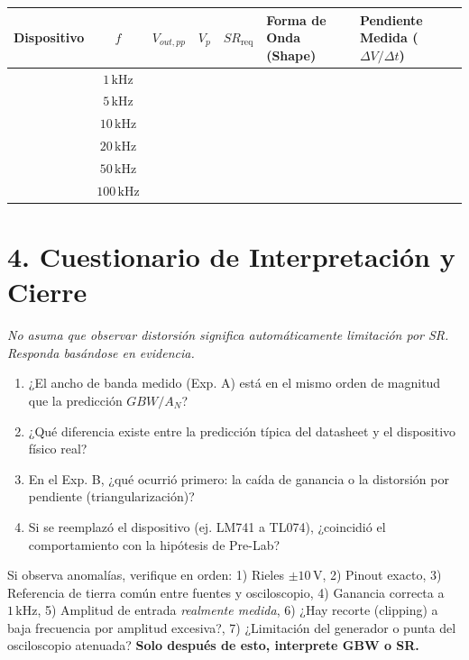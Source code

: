 \documentclass[11pt, a4paper]{article}
\begin{document}
\vspace{0.4cm}
\begin{table}[h!]
    \centering
    \footnotesize
    \renewcommand{\arraystretch}{1.3}
    \begin{tabularx}{\textwidth}{|>{\hsize=0.8\hsize}X|c|c|c|c|X|X|}
    \hline
    \textbf{Dispositivo} & \textbf{$f$} & \textbf{$V_{out,pp}$} & \textbf{$V_p$} & \textbf{$SR_{\mathrm{req}}$} & \textbf{Forma de Onda (Shape)} & \textbf{Pendiente Medida ($\Delta V/\Delta t$)} \\ \hline
    & $1\,\text{kHz}$ & & & & & \\ \hline
    & $5\,\text{kHz}$ & & & & & \\ \hline
    & $10\,\text{kHz}$ & & & & & \\ \hline
    & $20\,\text{kHz}$ & & & & & \\ \hline
    & $50\,\text{kHz}$ & & & & & \\ \hline
    & $100\,\text{kHz}$ & & & & & \\ \hline
    \end{tabularx}
\end{table}

\section*{4. Cuestionario de Interpretación y Cierre}
\textit{No asuma que observar distorsión significa automáticamente limitación por SR. Responda basándose en evidencia.}
\begin{enumerate}
    \setlength{\itemsep}{0pt}
    \item ¿El ancho de banda medido (Exp. A) está en el mismo orden de magnitud que la predicción $GBW/A_N$?
    \item ¿Qué diferencia existe entre la predicción típica del datasheet y el dispositivo físico real?
    \item En el Exp. B, ¿qué ocurrió primero: la caída de ganancia o la distorsión por pendiente (triangularización)?
    \item Si se reemplazó el dispositivo (ej. LM741 a TL074), ¿coincidió el comportamiento con la hipótesis de Pre-Lab?
\end{enumerate}

\begin{tcolorbox}[colback=white, colframe=black, title=\textbf{Secuencia de Troubleshooting Frecuencial}]
    Si observa anomalías, verifique en orden: 1) Rieles $\pm10\,\text{V}$, 2) Pinout exacto, 3) Referencia de tierra común entre fuentes y osciloscopio, 4) Ganancia correcta a $1\,\text{kHz}$, 5) Amplitud de entrada \textit{realmente medida}, 6) ¿Hay recorte (clipping) a baja frecuencia por amplitud excesiva?, 7) ¿Limitación del generador o punta del osciloscopio atenuada? \textbf{Solo después de esto, interprete GBW o SR.}
\end{tcolorbox}
\end{document}
